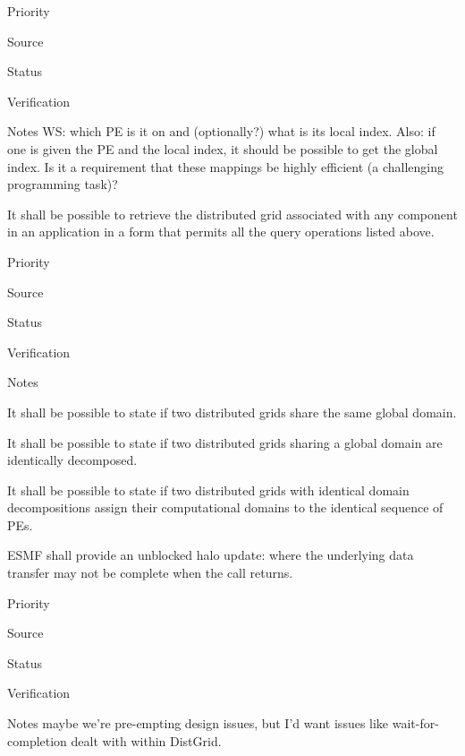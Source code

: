 \begin{reqlist}
\item[Priority]
\item[Source]
\item[Status]
\item[Verification]
\item[Notes] WS: which PE is it on and (optionally?) what 
is its local index.  Also: if one is given the PE and the local index, 
it should be possible to get the global index.  Is it a requirement that
these mappings be highly efficient (a challenging programming task)?
\end{reqlist}


It shall be possible to retrieve the distributed grid associated with
any component in an application in a form that permits all the query
operations listed above.

\begin{reqlist}
\item[Priority]
\item[Source]
\item[Status]
\item[Verification]
\item[Notes]
\end{reqlist}



It shall be possible to state if two distributed grids share the same
global domain.


It shall be possible to state if two distributed grids sharing a
global domain are identically decomposed.


It shall be possible to state if two distributed grids with identical
domain decompositions assign their computational domains to the
identical sequence of PEs.



ESMF shall provide an unblocked halo update: where the underlying
data transfer may not be complete when the call returns.

\begin{reqlist}
\item[Priority]
\item[Source]
\item[Status]
\item[Verification]
\item[Notes] maybe we're pre-empting design issues, but I'd want
  issues like wait-for-completion dealt with within DistGrid.
\end{reqlist}

